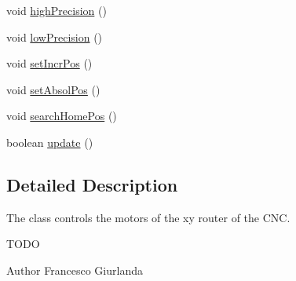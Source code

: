 \begin{DoxyCompactItemize}
void \hyperlink{class_c_n_c___router_ad82ea519e54f4ec488c10c150df26984}{high\+Precision} ()
\item 
void \hyperlink{class_c_n_c___router_a15e3fab9eefaa7a61403c0054e643901}{low\+Precision} ()
\item 
void \hyperlink{class_c_n_c___router_abbda24db494dd328382639412570978e}{set\+Incr\+Pos} ()
\item 
void \hyperlink{class_c_n_c___router_a8629d6232f16d039ff386b0f02d45895}{set\+Absol\+Pos} ()
\item 
void \hyperlink{class_c_n_c___router_a4e9504d77eee555ddb35af073b67d3f1}{search\+Home\+Pos} ()
\item 
boolean \hyperlink{class_c_n_c___router_a3a8982d9582e2144d38791626b3060e6}{update} ()
\end{DoxyCompactItemize}


\subsection{Detailed Description}
The class controls the motors of the xy router of the C\+N\+C. 

T\+O\+D\+O \begin{DoxyAuthor}{Author}
Francesco Giurlanda 
\end{DoxyAuthor}



